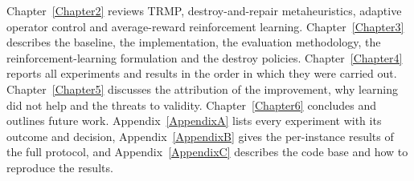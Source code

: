 Chapter~\ref{Chapter2} reviews TRMP, destroy-and-repair metaheuristics, adaptive operator control and average-reward reinforcement learning. Chapter~\ref{Chapter3} describes the baseline, the implementation, the evaluation methodology, the reinforcement-learning formulation and the destroy policies. Chapter~\ref{Chapter4} reports all experiments and results in the order in which they were carried out. Chapter~\ref{Chapter5} discusses the attribution of the improvement, why learning did not help and the threats to validity. Chapter~\ref{Chapter6} concludes and outlines future work. Appendix~\ref{AppendixA} lists every experiment with its outcome and decision, Appendix~\ref{AppendixB} gives the per-instance results of the full protocol, and Appendix~\ref{AppendixC} describes the code base and how to reproduce the results.
